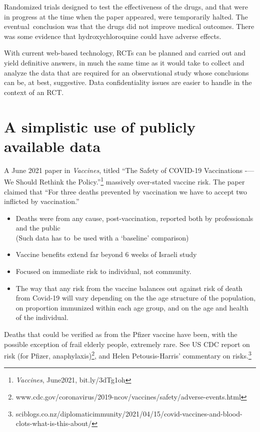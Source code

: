 \documentclass[
  10pt,
  b5paper]{book}
\providecommand{\tightlist}{%
  \setlength{\itemsep}{0pt}\setlength{\parskip}{0pt}}
\begin{document}
Randomized trials designed to test the effectiveness of the drugs,
and that were in progress at the time when the paper appeared,
were temporarily halted. The eventual~conclusion was that the
drugs did not improve medical outcomes. There was some evidence
that hydroxychloroquine could have adverse effects.

With current web-based technology, RCTs can be planned and carried out and yield definitive answers, in much the same time as it would take to collect and analyze the data that are required for an observational study whose conclusions can be, at best, suggestive. Data confidentiality issues are easier to handle in the context of an RCT.

\hypertarget{a-simplistic-use-of-publicly-available-data}{%
\section{A simplistic use of publicly available data}\label{a-simplistic-use-of-publicly-available-data}}

A June 2021 paper in \emph{Vaccines}, titled
``The Safety of COVID-19 Vaccinations -\/--- We Should Rethink the Policy.''\footnote{\emph{Vaccines}, June2021, bit.ly/3dTg1oh}
massively over-stated vaccine risk. The paper claimed that
``For three deaths prevented by vaccination we have to accept
two inflicted by vaccination.''

\begin{itemize}
\tightlist
\item
  Deaths were from any cause, post-vaccination, reported both by
  professionals and the public\\
  (Such data has to~be used with a `baseline' comparison)
\item
  Vaccine benefits extend far beyond 6 weeks of Israeli study
\item
  Focused on immediate risk to individual, not community.
\item
  The way that any risk from the vaccine balances out against
  risk of death from Covid-19 will vary depending on the the age
  structure of the population, on proportion immunized within
  each age group, and on the age and health of the individual.
\end{itemize}

Deaths that could be verified as from the Pfizer vaccine have been,
with the possible exception of frail elderly people, extremely rare.
See US CDC report on risk (for Pfizer, anaphylaxis)\footnote{www.cdc.gov/coronavirus/2019-ncov/vaccines/safety/adverse-events.html},
and Helen Petousis-Harris' commentary on risks.\footnote{sciblogs.co.nz/diplomaticimmunity/2021/04/15/covid-vaccines-and-blood-clots-what-is-this-about/}
\end{document}
